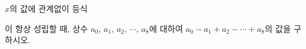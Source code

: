 $x$의 값에 관계없이 등식\par\smallskip{}\par\smallskip\noindent 이 항상 성립할 때, 상수 $a_0$, $a_1$, $a_2$, $\cdots$, $a_8$에 대하여 $a_0-a_1+a_2-\cdots+a_8$의 값을 구하시오.
